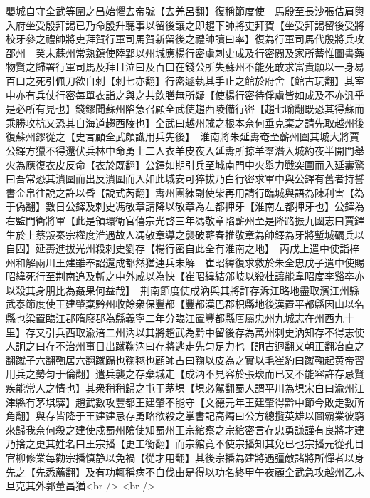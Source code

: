 嬰城自守全武等圍之昌始懼去帝號【去羌呂翻】復稱節度使　馬殷至長沙張佶肩輿入府坐受殷拜謁已乃命殷升聽事以留後讓之即趨下帥將吏拜賀【坐受拜謁留後受將校牙參之禮帥將吏拜賀行軍司馬賀新留後之禮帥讀曰率】復為行軍司馬代殷將兵攻邵州　癸未蘇州常熟鎮使陸郢以州城應楊行密虜刺史成及行密閲及家所蓄惟圖書藥物賢之歸署行軍司馬及拜且泣曰及百口在錢公所失蘇州不能死敢求富貴願以一身易百口之死引佩刀欲自刺【刺七亦翻】行密遽執其手止之館於府舍【館古玩翻】其室中亦有兵仗行密每單衣詣之與之共飲膳無所疑【使楊行密待俘虜皆如成及不亦汎乎是必所有見也】錢鏐聞蘇州陷急召顧全武使趨西陵備行密【趨七喻翻既恐其得蘇而乘勝攻杭又恐其自海道趨西陵也】全武曰越州賊之根本奈何垂克棄之請先取越州後復蘇州鏐從之【史言顧全武頗䜟用兵先後】　淮南將朱延夀奄至蘄州圍其城大將賈公鐸方獵不得還伏兵林中命勇士二人衣羊皮夜入延夀所掠羊羣潛入城約夜半開門舉火為應復衣皮反命【衣於既翻】公鐸如期引兵至城南門中火舉力戰突圍而入延夀驚曰吾常恐其潰圍而出反潰圍而入如此城安可猝拔乃白行密求軍中與公鐸有舊者持誓書金帛往說之許以昏【說式芮翻】夀州團練副使柴再用請行臨城與語為陳利害【為于偽翻】數日公鐸及刺史馮敬章請降以敬章為左都押牙【淮南左都押牙也】公鐸為右監門衛將軍【此是領環衛官僖宗光啓三年馮敬章陷蘄州至是降路振九國志曰賈鐸生於上蔡叛秦宗權度淮遇故人馮敬章導之襲破蘄春推敬章為帥鐸為牙將塹城礪兵以自固】延夀進拔光州殺刺史劉存【楊行密自此全有淮南之地】　丙戌上遣中使詣梓州和解兩川王建雖奉詔還成都然猶連兵未解　崔昭緯復求救於朱全忠戊子遣中使賜昭緯死行至荆南追及斬之中外咸以為快【崔昭緯結邠岐以殺杜讓能韋昭度李谿卒亦以殺其身朋比為姦果何益哉】　荆南節度使成汭與其將許存泝江略地盡取濱江州縣武泰節度使王建肇棄黔州收餘衆保豐都【豐都漢巴郡枳縣地後漢置平都縣因山以名縣也梁置臨江郡隋廢郡為縣義寧二年分臨江置豐都縣唐屬忠州九城志在州西九十里】存又引兵西取渝涪二州汭以其將趙武為黔中留後存為萬州刺史汭知存不得志使人詗之曰存不治州事日出蹴鞠汭曰存將逃走先匀足力也【詗古迥翻又朝正翻冶直之翻蹴子六翻鞫居六翻蹴蹋也鞠毬也顧師古曰鞠以皮為之實以毛崔豹曰蹴鞠起黄帝習用兵之勢匀于倫翻】遣兵襲之存棄城走【成汭不見容於張瓌而已又不能容許存忌賢疾能常人之情也】其衆稍稍歸之屯于茅埧【埧必駕翻蜀人謂平川為埧宋白曰渝州江津縣有茅㙋驛】趙武數攻豐都王建肇不能守【文德元年王建肇得黔中節今敗走數所角翻】與存皆降于王建建忌存勇略欲殺之掌書記高燭曰公方總攬英雄以圖霸業彼窮來歸我奈何殺之建使戍蜀州隂使知蜀州王宗綰察之宗綰密言存忠勇謙謹有良將才建乃捨之更其姓名曰王宗播【更工衡翻】而宗綰竟不使宗播知其免已也宗播元從孔目官柳修業每勸宗播慎静以免禍【從才用翻】其後宗播為建將遇彊敵諸將所憚者以身先之【先悉薦翻】及有功輒稱病不自伐由是得以功名終甲午夜顧全武急攻越州乙未旦克其外郭董昌猶<br />
<br />
